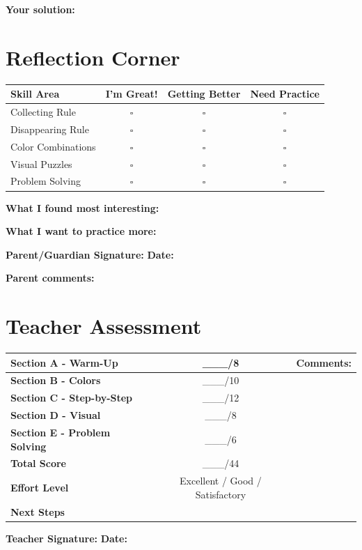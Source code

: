 \documentclass{article}
\begin{document}
\textbf{Your solution:} \underline{\hspace{7cm}}

\vspace{2cm}

\section*{Reflection Corner}
\begin{tabular}{|l|c|c|c|}
\hline
\textbf{Skill Area} & \textbf{I'm Great!} & \textbf{Getting Better} & \textbf{Need Practice} \\
\hline
Collecting Rule & $\square$ & $\square$ & $\square$ \\
\hline
Disappearing Rule & $\square$ & $\square$ & $\square$ \\
\hline
Color Combinations & $\square$ & $\square$ & $\square$ \\
\hline
Visual Puzzles & $\square$ & $\square$ & $\square$ \\
\hline
Problem Solving & $\square$ & $\square$ & $\square$ \\
\hline
\end{tabular}

\vspace{0.5cm}

\textbf{What I found most interesting:} \underline{\hspace{8cm}}

\textbf{What I want to practice more:} \underline{\hspace{8cm}}

\vspace{0.5cm}

\textbf{Parent/Guardian Signature:} \underline{\hspace{5cm}} \textbf{Date:} \underline{\hspace{3cm}}

\textbf{Parent comments:} \underline{\hspace{10cm}}

\section*{Teacher Assessment}
\begin{tabular}{|l|c|l|}
\hline
\textbf{Section A - Warm-Up} & \_\_\_/8 & Comments: \\
\hline
\textbf{Section B - Colors} & \_\_\_/10 & \\
\hline
\textbf{Section C - Step-by-Step} & \_\_\_/12 & \\
\hline
\textbf{Section D - Visual} & \_\_\_/8 & \\
\hline
\textbf{Section E - Problem Solving} & \_\_\_/6 & \\
\hline
\textbf{Total Score} & \_\_\_/44 & \\
\hline
\textbf{Effort Level} & Excellent / Good / Satisfactory & \\
\hline
\textbf{Next Steps} & \multicolumn{2}{|l|}{} \\
\hline
\end{tabular}

\vspace{0.5cm}

\textbf{Teacher Signature:} \underline{\hspace{4cm}} \textbf{Date:} \underline{\hspace{3cm}}
\end{document}
